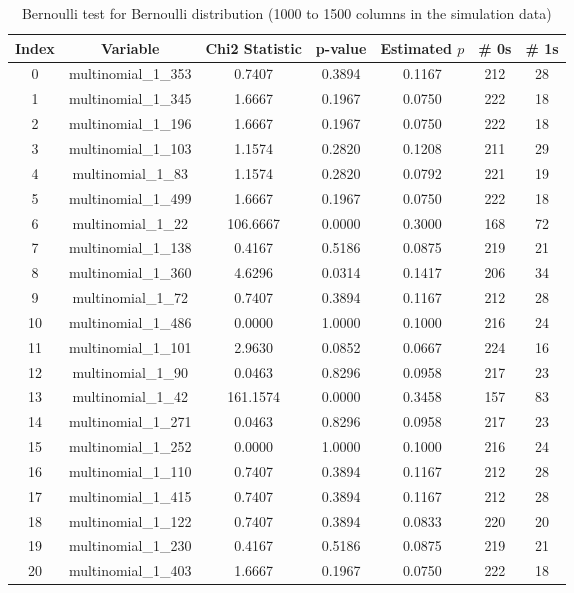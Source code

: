 \begin{table}[!h]
\centering
\caption{Bernoulli test for Bernoulli distribution (1000 to 1500 columns in the simulation data)}
\label{tab:bernoulli_metrics}
\begin{tabular}{ccccccc}
\toprule
\textbf{Index} & \textbf{Variable} & \textbf{Chi2 Statistic} & \textbf{p-value} & \textbf{Estimated $p$} & \textbf{\# 0s} & \textbf{\# 1s} \\
\midrule
0 & multinomial\_1\_353 & 0.7407 & 0.3894 & 0.1167 & 212 & 28 \\
1 & multinomial\_1\_345 & 1.6667 & 0.1967 & 0.0750 & 222 & 18 \\
2 & multinomial\_1\_196 & 1.6667 & 0.1967 & 0.0750 & 222 & 18 \\
3 & multinomial\_1\_103 & 1.1574 & 0.2820 & 0.1208 & 211 & 29 \\
4 & multinomial\_1\_83 & 1.1574 & 0.2820 & 0.0792 & 221 & 19 \\
5 & multinomial\_1\_499 & 1.6667 & 0.1967 & 0.0750 & 222 & 18 \\
6 & multinomial\_1\_22 & 106.6667 & 0.0000 & 0.3000 & 168 & 72 \\
7 & multinomial\_1\_138 & 0.4167 & 0.5186 & 0.0875 & 219 & 21 \\
8 & multinomial\_1\_360 & 4.6296 & 0.0314 & 0.1417 & 206 & 34 \\
9 & multinomial\_1\_72 & 0.7407 & 0.3894 & 0.1167 & 212 & 28 \\
10 & multinomial\_1\_486 & 0.0000 & 1.0000 & 0.1000 & 216 & 24 \\
11 & multinomial\_1\_101 & 2.9630 & 0.0852 & 0.0667 & 224 & 16 \\
12 & multinomial\_1\_90 & 0.0463 & 0.8296 & 0.0958 & 217 & 23 \\
13 & multinomial\_1\_42 & 161.1574 & 0.0000 & 0.3458 & 157 & 83 \\
14 & multinomial\_1\_271 & 0.0463 & 0.8296 & 0.0958 & 217 & 23 \\
15 & multinomial\_1\_252 & 0.0000 & 1.0000 & 0.1000 & 216 & 24 \\
16 & multinomial\_1\_110 & 0.7407 & 0.3894 & 0.1167 & 212 & 28 \\
17 & multinomial\_1\_415 & 0.7407 & 0.3894 & 0.1167 & 212 & 28 \\
18 & multinomial\_1\_122 & 0.7407 & 0.3894 & 0.0833 & 220 & 20 \\
19 & multinomial\_1\_230 & 0.4167 & 0.5186 & 0.0875 & 219 & 21 \\
20 & multinomial\_1\_403 & 1.6667 & 0.1967 & 0.0750 & 222 & 18 \\

\end{tabular}
\end{table}
